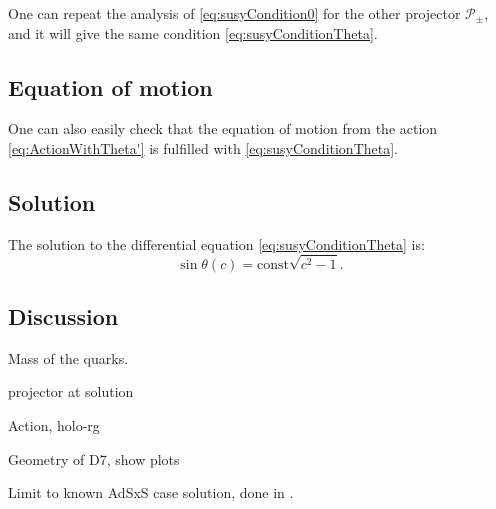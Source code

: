 One can repeat the analysis of \eqref{eq:susyCondition0} for the other projector $\mathcal{P}_{\pm}$, and it will give the same condition \eqref{eq:susyConditionTheta}.

\subsection{Equation of motion}

One can also easily check that the equation of motion from the action \eqref{eq:ActionWithTheta'} is fulfilled with \eqref{eq:susyConditionTheta}.



\subsection{Solution}
The solution to the differential equation \eqref{eq:susyConditionTheta} is:
\begin{equation}\label{eq:susyConditionSolution}
\sin\theta(c) = \text{const} \sqrt{c^2-1}.
\end{equation}


\subsection{Discussion}

Mass of the quarks. 

projector at solution

Action, holo-rg

Geometry of D7, show plots

Limit to known AdSxS case solution, done in \cite{Karch:2005ms}.

